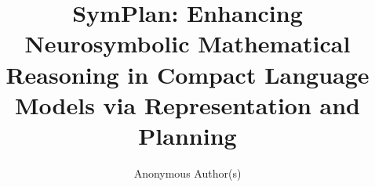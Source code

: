 \documentclass[runningheads]{llncs}
\begin{document}
\title{SymPlan: Enhancing Neurosymbolic Mathematical Reasoning in Compact Language Models via Representation and Planning}

\author{Anonymous Author(s)}


\maketitle
\end{document}
